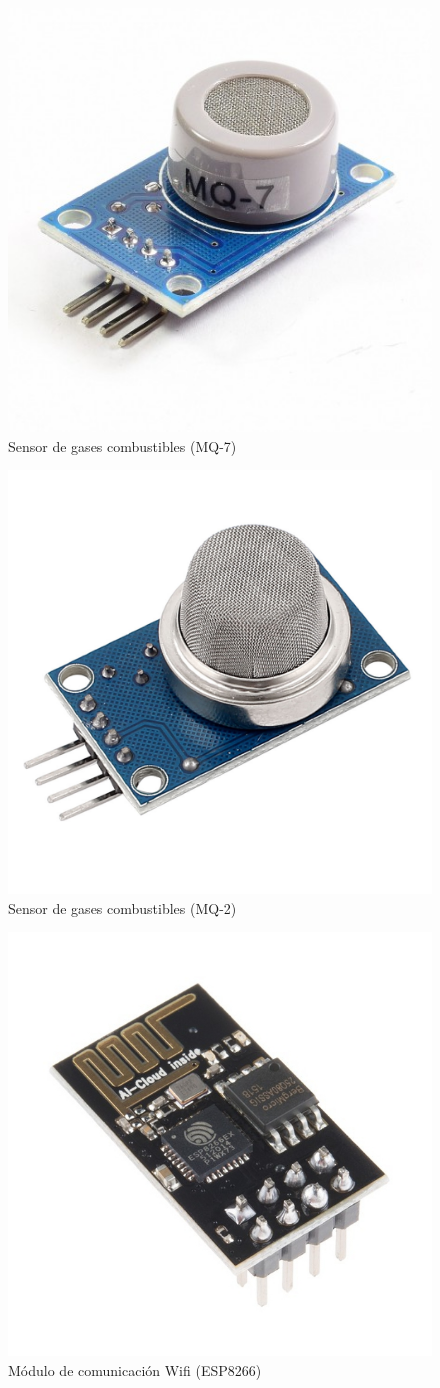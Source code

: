 \documentclass{IEEEtran}
\begin{document}
			\begin{figure}
				\centering
				\includegraphics[width=0.5\linewidth]{arduino-modulo-monoxido-1}
				\caption{Sensor de gases combustibles (MQ-7)}
				\label{arduino-modulo-monoxido-1}
			\end{figure}

			\begin{figure}
				\centering
				\includegraphics[width=0.5\linewidth]{arduino-modulo-monoxido-2}
				\caption{Sensor de gases combustibles (MQ-2)}
				\label{arduino-modulo-monoxido-2}
			\end{figure}

			\begin{figure}
				\centering
				\includegraphics[width=0.5\linewidth]{arduino-modulo-wifi}
				\caption{Módulo de comunicación Wifi (ESP8266)}
				\label{arduino-modulo-wifi}
			\end{figure}
\end{document}
